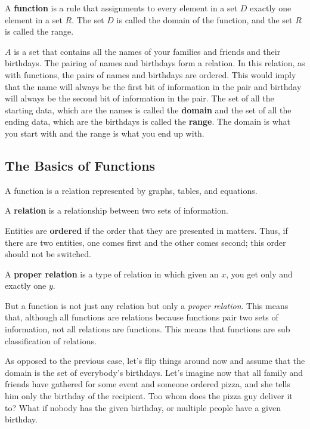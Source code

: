 \begin{definition}[Function]
  \label{def:function}

  A \textbf{function} is a rule that assignments to every element in a set $D$ 
  exactly one element in a set $R$. The set $D$ is called the domain of the
  function, and the set $R$ is called the range.
\end{definition}

\begin{example}
  $A$ is a set that contains all the names of your families and friends and
  their birthdays. The pairing of names and birthdays form a relation. In this
  relation, as with functions, the pairs of names and birthdays are ordered.
  This would imply that the name will always be the first bit of information in
  the pair and birthday will always be the second bit of information in the
  pair. The set of all the starting data, which are the names is called the
  \textbf{domain} and the set of all the ending data, which are the birthdays
  is called the \textbf{range}. The domain is what you start with and the range
  is what you end up with.
\end{example}

\subsection{The Basics of Functions}
\label{sub_sec:the_basics_of_functions}

A function is a relation represented by graphs, tables, and equations.

\begin{definition}
  A \textbf{relation} is a relationship between two sets of information.

  Entities are \textbf{ordered} if the order that they are presented in
  matters. Thus, if there are two entities, one comes first and the other comes
  second; this order should not be switched.

  A \textbf{proper relation} is a type of relation in which given an $x$, you
  get only and exactly one $y$.
\end{definition}

But a function is not just any relation but only a \textit{proper relation}.
This means that, although all functions are relations because functions pair
two sets of information, not all relations are functions. This means that
functions are sub classification of relations.

\begin{example}
  As opposed to the previous case, let's flip things around now and assume that
  the domain is the set of everybody's birthdays. Let's imagine now that all
  family and friends have gathered for some event and someone ordered pizza,
  and she tells him only the birthday of the recipient. Too whom does the pizza
  guy deliver it to? What if nobody has the given birthday, or multiple people
  have a given birthday.
\end{example}

